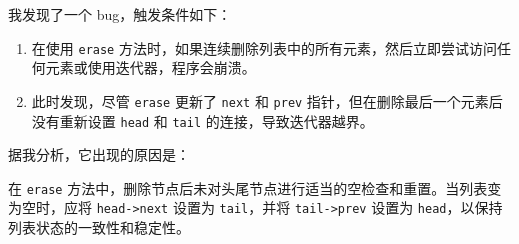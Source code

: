 \documentclass[UTF8]{ctexart}
\begin{document}
我发现了一个 bug，触发条件如下：  
  
\begin{enumerate}    
    \item 在使用 \texttt{erase} 方法时，如果连续删除列表中的所有元素，然后立即尝试访问任何元素或使用迭代器，程序会崩溃。    
    \item 此时发现，尽管 \texttt{erase} 更新了 \texttt{next} 和 \texttt{prev} 指针，但在删除最后一个元素后没有重新设置 \texttt{head} 和 \texttt{tail} 的连接，导致迭代器越界。    
\end{enumerate}    
  
据我分析，它出现的原因是：  
  
在 \texttt{erase} 方法中，删除节点后未对头尾节点进行适当的空检查和重置。当列表变为空时，应将 \texttt{head->next} 设置为 \texttt{tail}，并将 \texttt{tail->prev} 设置为 \texttt{head}，以保持列表状态的一致性和稳定性。  
  
\end{document}

